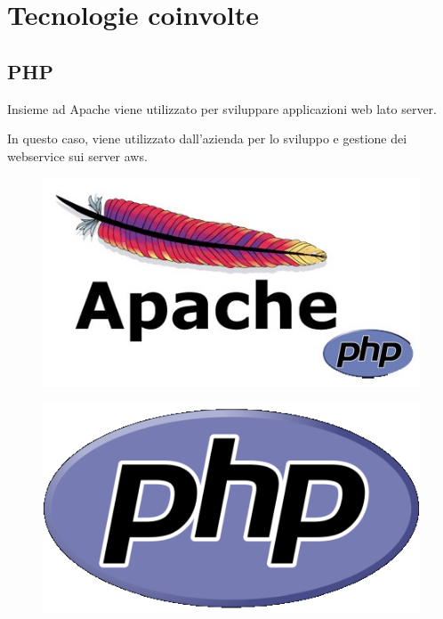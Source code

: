 
\chapter{Tecnologie coinvolte}
\label{cap:tecnologie-coinvolte}
\section{PHP}
\begin{flushleft}
	Insieme ad Apache viene utilizzato per sviluppare applicazioni web lato server.
	
	In questo caso, viene utilizzato dall'azienda per lo sviluppo e gestione dei webservice sui server \gls{aws}.
\end{flushleft}
\begin{figure}[!h] 
	\centering
	\includegraphics[scale = 1]{immagini/tecnologie/apache}
\end{figure}
\begin{figure}[!h] 
	\centering
	\includegraphics[scale = 0.3]{immagini/tecnologie/php}
\end{figure}
